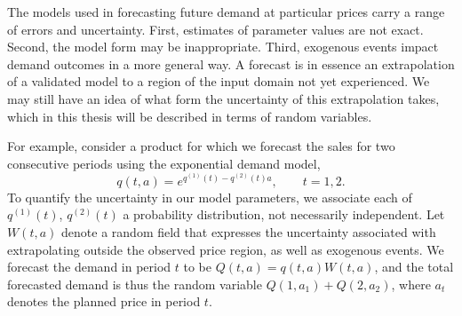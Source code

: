 \documentclass[main.tex]{subfiles}
\begin{document}
The models used in forecasting future demand at particular prices carry
a range of errors and uncertainty. First, estimates of parameter values are not
exact. Second, the model form may be
inappropriate. Third, exogenous events impact demand outcomes in a more general
way.
A forecast is in essence an extrapolation of a validated model to a
region of the input domain not yet experienced. We may still have an
idea of what form the uncertainty of this extrapolation takes, which
in this thesis will be described in terms of random variables.

For example, consider a product for which we forecast the sales for
two consecutive periods using the exponential demand model,
\begin{equation}
  q(t,a) =
  e^{q^{(1)}(t)-q^{(2)}(t)a},\qquad t=1,2.
\end{equation}
To quantify the uncertainty in our model parameters, we associate
each of $q^{(1)}(t)$, $q^{(2)}(t)$ a probability distribution, not
necessarily independent.
Let $W(t,a)$ denote a random field that expresses the uncertainty
associated with extrapolating outside the observed price region, as
well as exogenous events.
We forecast the demand in period $t$ to be $Q(t,a)=q(t,a)W(t,a)$, and
the total forecasted demand is thus the random variable $Q(1,a_1) +
Q(2,a_2)$, where $a_t$ denotes the planned price in period $t$.
\end{document}
